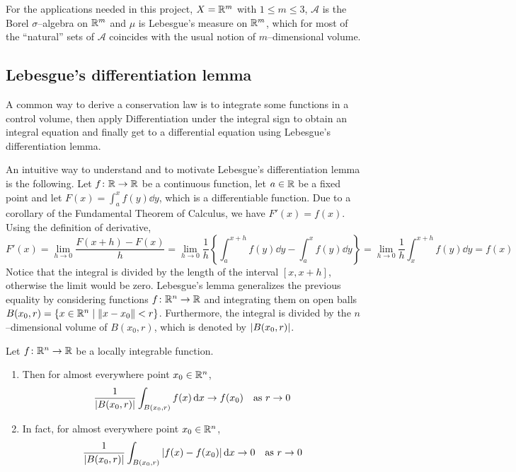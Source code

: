 For the applications needed in this project, $X = \mathbb{R}^m$ with $1 \leq m \leq
3$, $\mathcal{A}$ is the Borel $\sigma$--algebra on $\mathbb{R}^m$ and $\mu$ is
Lebesgue's measure on $\mathbb{R}^m$, which for most of the ``natural'' sets of
$\mathcal{A}$ coincides with the usual notion of $m$--dimensional volume.

\subsection{Lebesgue's differentiation lemma}

A common way to derive a conservation law is to integrate some functions in a
control volume, then apply Differentiation under the integral sign to obtain an
integral equation and finally get to a differential equation using Lebesgue's
differentiation lemma. 

An intuitive way to understand and to motivate Lebesgue's differentiation lemma
is the following. Let $f \colon \mathbb{R} \to \mathbb{R}$ be a continuous function, let
$a \in \mathbb{R}$ be a fixed point and let $F(x) = \int_a^x f(y) \dd{y}$, which is a
differentiable function. Due to a corollary of the Fundamental Theorem of
Calculus, we have $F'(x) = f(x)$. Using the definition of derivative,
\[
	F'(x) = 
	\lim_{h \to 0} \frac{F(x + h) - F(x)}{h} = 
	\lim_{h \to 0} \frac{1}{h} \left\{ \int_a^{x + h} f(y) \dd{y} - \int_a^{x} f(y) \dd{y} \right\} = 
	\lim_{h \to 0} \frac{1}{h} \int_x^{x + h} f(y) \dd{y} = f(x)
\]
Notice that the integral is divided by the length of the interval $[x, x+h]$,
otherwise the limit would be zero. Lebesgue's lemma generalizes the previous
equality by considering functions $f \colon \mathbb{R}^n \to \mathbb{R}$ and integrating
them on open balls $B(x_0, r) = \{ x \in \mathbb{R}^n \mid \norm{x -
x_0} < r\}$. Furthermore, the integral is divided by the $n$--dimensional
volume of $B(x_0, r)$, which is denoted by $\abs{B(x_0, r)}$.

\begin{theorem}
	\label{eq:lebesgue_differentiation_lemma} Let $f \colon \mathbb{R}^n \rightarrow
	\mathbb{R}$ be a locally integrable function.
	\begin{enumerate}[label={(\arabic*)}, topsep=0pt]
		\item Then for almost everywhere point $x_0 \in \mathbb{R}^n$,
		\[
			\frac{1}{\abs{B(x_0, r)}} \int_{B(x_0,r)} f(x) \dd{x} \to f(x_0) 
			\quad \text{as } r \to 0
		\]
		\item In fact, for almost everywhere point $x_0 \in \mathbb{R}^n$,
		\[
			\frac{1}{\abs{B(x_0, r)}} \int_{B(x_0,r)} \abs{f(x) - f(x_0)} \dd{x} \to 0 
			\quad \text{as } r \to 0
		\]		
	\end{enumerate}
\end{theorem}
